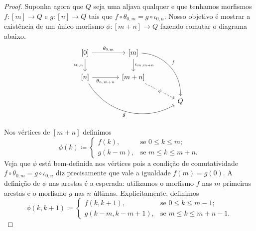 \begin{proof}
    Suponha agora que $Q$ seja uma aljava qualquer e que tenhamos morfismos $f: [m] \to Q$ e $g: [n] \to Q$ tais que $f \circ \theta_{0,m} = g \circ \iota_{0,n}$.
    Nosso objetivo é mostrar a existência de um único morfismo $\phi: [m+n] \to Q$ fazendo comutar o diagrama abaixo.
    \begin{displaymath}
        \begin{tikzcd}[column sep=1.35cm]
            {[0]}
            \arrow[r,"{\theta_{0,m}}"]
            \arrow[d, "{\iota_{0,n}}" swap]
            & {[m]}
            \arrow[d, "{\iota_{m,m+n}}"]
            \arrow[rdd, bend left=45, "f"]
            \\ {[n]}
            \arrow[r, "{\theta_{n,m+n}}" swap]
            \arrow[rrd, bend right=45, "g" swap]
            & {[m+n]}
            \arrow[rd, dashed, "\phi" description]
            \\ & & Q
        \end{tikzcd}
    \end{displaymath}
    Nos vértices de $[m+n]$ definimos
    \begin{displaymath}
        \phi(k) \coloneqq
        \begin{cases}
            f(k), & \text{se } 0 \leq k \leq m; \\
            g(k-m), & \text{se } m \leq k \leq m+n.
        \end{cases}
    \end{displaymath}
    Veja que $\phi$ está bem-definida nos vértices pois a condição de comutatividade $f \circ \theta_{0,m} = g \circ \iota_{0,n}$ diz precisamente que vale a igualdade $f(m) = g(0)$.
    A definição de $\phi$ nas arestas é a esperada: utilizamos o morfismo $f$ nas $m$ primeiras arestas e o morfismo $g$ nas $n$ últimas.
    Explicitamente, definimos
    \begin{displaymath}
        \phi(k,k+1) \coloneqq
        \begin{cases}
            f(k,k+1), & \text{se } 0 \leq k \leq m-1; \\
            g(k-m,k-m+1), & \text{se } m \leq k \leq m+n-1.
        \end{cases}
    \end{displaymath}
    

\end{proof}
